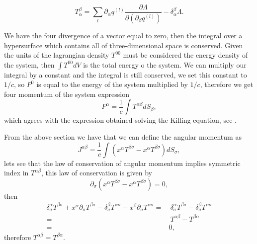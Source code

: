 \begin{appendix}
\[
T_{\alpha}^{\beta}=\sum_{l}\partial_{\alpha}q^{(l)}\frac{\partial\Lambda}{\partial\left(\partial_{\beta}q^{(l)}\right)}-\delta_{\alpha}^{\beta}\Lambda.
\]

We have the four divergence of a vector equal to zero, then the integral
over a hypersurface which contains all of three-dimensional space
is conserved. Given the units of the lagrangian density $T^{00}$
must be considered the energy density of the system, then $\int T^{00}dV$
is the total energy o the system. We can multiply our integral by
a constant and the integral is still conserved, we set this constant
to $1/c$, so $P^{0}$ is equal to the energy of the system multiplied
by $1/c$, therefore we get four momentum of the system expression
\[
P^{\alpha}=\frac{1}{c}\int T^{\alpha\beta}dS_{\beta},
\]
which agrees with the expression obtained solving the Killing equation,
see \cite{DEWITT}. 

From the above section we have that we can define the angular momentum
as
\[
J^{\alpha\beta}=\frac{1}{c}\int\left(x^{\alpha}T^{\beta\sigma}-x^{\alpha}T^{\beta\sigma}\right)dS_{\sigma},
\]
lets see that the law of conservation of angular momentum implies
symmetric index in $T^{\alpha\beta}$, this law of conservation is
given by
\[
\partial_{\sigma}\left(x^{\alpha}T^{\beta\sigma}-x^{\alpha}T^{\beta\sigma}\right)=0,
\]
then
\begin{align*}
\delta_{\sigma}^{\alpha}T^{\beta\sigma}+x^{\alpha}\partial_{\sigma}T^{\beta\sigma}-\delta_{\sigma}^{\beta}T^{\alpha\sigma}-x^{\beta}\partial_{\sigma}T^{\alpha\sigma}= & \ \delta_{\sigma}^{\alpha}T^{\beta\sigma}-\delta_{\sigma}^{\beta}T^{\alpha\sigma}\\
= & \ T^{\alpha\beta}-T^{\beta\alpha}\\
= & 0,
\end{align*}
therefore $T^{\alpha\beta}=T^{\beta\alpha}$.


\end{appendix}